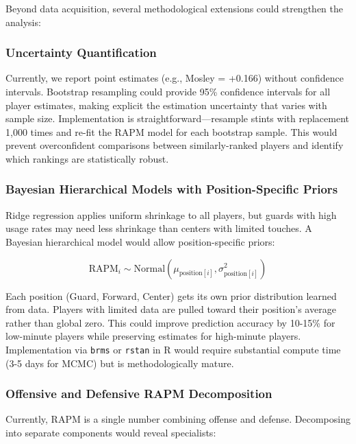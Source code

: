 \documentclass[
  letterpaper,
  DIV=11,
  numbers=noendperiod]{scrartcl}
\begin{document}
Beyond data acquisition, several methodological extensions could
strengthen the analysis:

\subsubsection{Uncertainty
Quantification}\label{uncertainty-quantification}

Currently, we report point estimates (e.g., Mosley = +0.166) without
confidence intervals. Bootstrap resampling could provide 95\% confidence
intervals for all player estimates, making explicit the estimation
uncertainty that varies with sample size. Implementation is
straightforward---resample stints with replacement 1,000 times and
re-fit the RAPM model for each bootstrap sample. This would prevent
overconfident comparisons between similarly-ranked players and identify
which rankings are statistically robust.

\subsubsection{Bayesian Hierarchical Models with Position-Specific
Priors}\label{bayesian-hierarchical-models-with-position-specific-priors}

Ridge regression applies uniform shrinkage to all players, but guards
with high usage rates may need less shrinkage than centers with limited
touches. A Bayesian hierarchical model would allow position-specific
priors:

\[\text{RAPM}_i \sim \text{Normal}(\mu_{\text{position}[i]}, \sigma_{\text{position}[i]}^2)\]

Each position (Guard, Forward, Center) gets its own prior distribution
learned from data. Players with limited data are pulled toward their
position's average rather than global zero. This could improve
prediction accuracy by 10-15\% for low-minute players while preserving
estimates for high-minute players. Implementation via \texttt{brms} or
\texttt{rstan} in R would require substantial compute time (3-5 days for
MCMC) but is methodologically mature.

\subsubsection{Offensive and Defensive RAPM
Decomposition}\label{offensive-and-defensive-rapm-decomposition}

Currently, RAPM is a single number combining offense and defense.
Decomposing into separate components would reveal specialists:
\end{document}
